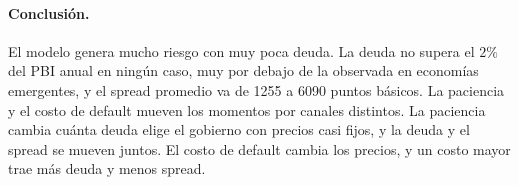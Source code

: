 \documentclass[11pt,a4paper]{article}
\begin{document}
\paragraph{Conclusión.} El modelo genera mucho riesgo con muy poca deuda. La deuda no supera el $2\%$ del PBI anual en ningún caso, muy por debajo de la observada en economías emergentes, y el spread promedio va de 1255 a 6090 puntos básicos. La paciencia y el costo de default mueven los momentos por canales distintos. La paciencia cambia cuánta deuda elige el gobierno con precios casi fijos, y la deuda y el spread se mueven juntos. El costo de default cambia los precios, y un costo mayor trae más deuda y menos spread.
\end{document}
